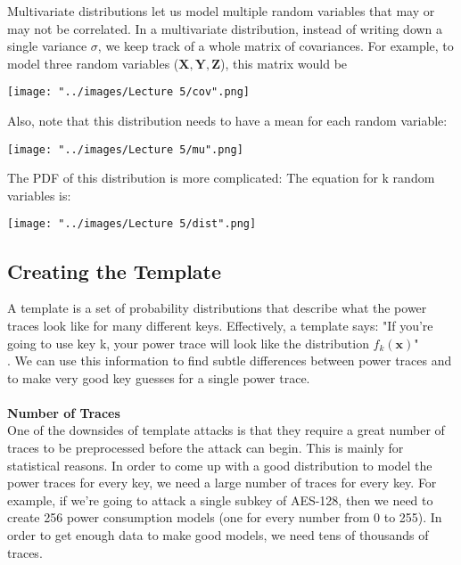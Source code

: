 \documentclass{report}
\begin{document}
    Multivariate distributions let us model multiple random variables that may or may not be correlated. In a multivariate distribution, instead of writing down a single variance $\sigma$, we keep track of a whole matrix of covariances. For example, to model three random variables ($\mathbf{X}, \mathbf{Y}, \mathbf{Z}$), this matrix would be\\
    \begin{minipage}{\linewidth}
      \centering
      \texttt{[image: "../images/Lecture 5/cov".png]}
      \end{minipage}
    Also, note that this distribution needs to have a mean for each random variable:\\
       \begin{minipage}{\linewidth}
      \centering
      \texttt{[image: "../images/Lecture 5/mu".png]}
      \end{minipage}
    The PDF of this distribution is more complicated: The equation for k random variables is:\\
     \begin{minipage}{\linewidth}
      \centering
      \texttt{[image: "../images/Lecture 5/dist".png]}
      \end{minipage}

\subsection{Creating the Template}
    A template is a set of probability distributions that describe what the power traces look like for many different keys. Effectively, a template says: "If you're going to use key k, your power trace will look like the distribution $f_k(\mathbf{x})$"\\
    . We can use this information to find subtle differences between power traces and to make very good key guesses for a single power trace.\\
    \\
    \textbf{Number of Traces}\\
    One of the downsides of template attacks is that they require a great number of traces to be preprocessed before the attack can begin. This is mainly for statistical reasons. In order to come up with a good distribution to model the power traces for every key, we need a large number of traces for every key. For example, if we're going to attack a single subkey of AES-128, then we need to create 256 power consumption models (one for every number from 0 to 255). In order to get enough data to make good models, we need tens of thousands of traces.
    
\end{document}
